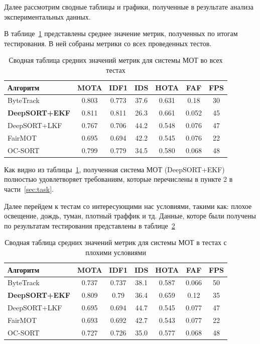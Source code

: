 Далее рассмотрим сводные таблицы и графики, полученные в результате анализа экспериментальных данных. 

В таблице~\ref{tab:average_results} представлены среднее значение метрик, полученных по итогам тестирования. В ней собраны метрики со всех проведенных тестов.

\begin{table}[h!]
    \centering
    \caption{Сводная таблица средних значений метрик для системы МОТ во всех тестах}
    \label{tab:average_results}
    \begin{tabular}{|l|c|c|c|c|c|c|}
        \hline
        \textbf{Алгоритм} & \textbf{MOTA} & \textbf{IDF1} & \textbf{IDS} & \textbf{HOTA} & \textbf{FAF} & \textbf{FPS} \\
        \hline
        ByteTrack & 0.803 & 0.773 & 37.6 & 0.631 & 0.18 & 30 \\ \hline 
        \textbf{DeepSORT+EKF} & 0.811 & 0.811 & 26.3 & 0.661 & 0.052 & 45 \\ \hline
        DeepSORT+LKF & 0.767 & 0.706 & 44.2 & 0.548 & 0.076 & 47 \\ \hline
        FairMOT & 0.695 & 0.694 & 42.2 & 0.545 & 0.076 & 22 \\ \hline
        OC-SORT & 0.799 & 0.779 & 34.5 & 0.580 & 0.068 & 48 \\ \hline
    \end{tabular}
\end{table}

Как видно из таблицы~\ref{tab:average_results}, полученная система МОТ (DeepSORT+EKF) полностью удовлетворяет требованиям, которые перечислены в пункте 2 в части~\ref{sec:task}.

Далее перейдем к тестам со интересующими нас условиями, такими как: плохое освещение, дождь, туман, плотный траффик и тд. Данные, которе были получены по результатам тестирования представлены в таблице~\ref{tab:specific_results}

\begin{table}[h!]
    \centering
    \caption{Сводная таблица средних значений метрик для системы МОТ в тестах с плохими условиями}
    \label{tab:specific_results}
    \begin{tabular}{|l|c|c|c|c|c|c|}
        \hline
        \textbf{Алгоритм} & \textbf{MOTA} & \textbf{IDF1} & \textbf{IDS} & \textbf{HOTA} & \textbf{FAF} & \textbf{FPS} \\
        \hline
        ByteTrack & 0.737 & 0.737 & 38.1 & 0.587 & 0.066 & 50 \\\hline
        \textbf{DeepSORT+EKF} & 0.809 & 0.79 & 36.4 & 0.659 & 0.12 & 35 \\\hline
        DeepSORT+LKF & 0.695 & 0.694 & 44.7 & 0.545 & 0.077 & 47 \\\hline
        FairMOT & 0.693 & 0.692 & 42.7 & 0.543 & 0.077 & 22 \\\hline
        OC-SORT & 0.727 & 0.726 & 35.0 & 0.577 & 0.068 & 48 \\\hline
    \end{tabular}
\end{table}

